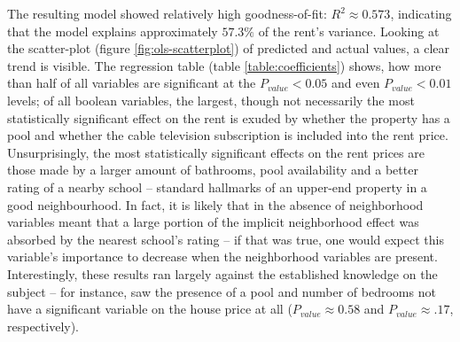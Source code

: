 \documentclass[12pt]{report}
\begin{document}
The resulting model showed relatively high goodness-of-fit: $R^2\approx0.573$, indicating that the model explains approximately $57.3\%$ of the rent's variance. Looking at the scatter-plot (figure \ref{fig:ols-scatterplot}) of predicted and actual values, a clear trend is visible. The regression table (table \ref{table:coefficients}) shows, how more than half of all variables are significant at the $P_{value}<0.05$ and even $P_{value}<0.01$ levels; of all boolean variables, the largest, though not necessarily the most statistically significant effect on the rent is exuded by whether the property has a pool and whether the cable television subscription is included into the rent price. Unsurprisingly, the most statistically significant effects on the rent prices are those made by a larger amount of bathrooms, pool availability and a better rating of a nearby school -- standard hallmarks of an upper-end property in a good neighbourhood. In fact, it is likely that in the absence of neighborhood variables meant that a large portion of the implicit neighborhood effect was absorbed by the nearest school's rating -- if that was true, one would expect this variable's importance to decrease when the neighborhood variables are present. Interestingly, these results ran largely against the established knowledge on the subject -- for instance, \cite{zietz2008} saw the presence of a pool and number of bedrooms not have a significant variable on the house price at all ($P_{value}\approx 0.58$ and $P_{value}\approx .17$, respectively).
\end{document}
